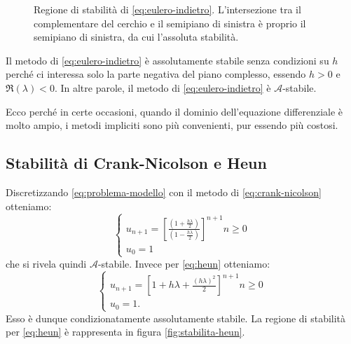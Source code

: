\begin{figure}[htpb]
	\caption{Regione di stabilità di \eqref{eq:eulero-indietro}. L'intersezione tra il complementare del cerchio e il semipiano di sinistra è proprio il semipiano di sinistra, da cui l'assoluta stabilità.}
\end{figure}
\FloatBarrier

Il metodo di \eqref{eq:eulero-indietro} è assolutamente stabile senza condizioni su $h$ perché ci interessa solo la parte negativa del piano complesso, essendo $h >0$ e $\Re ( \lambda ) < 0$.
In altre parole, il metodo di \eqref{eq:eulero-indietro} è $\mathcal{A}$-stabile.

Ecco perché in certe occasioni, quando il dominio dell'equazione differenziale è molto ampio, i metodi impliciti sono più convenienti, pur essendo più costosi.


\subsection{Stabilità di Crank-Nicolson e Heun}
Discretizzando \eqref{eq:problema-modello} con il metodo di \eqref{eq:crank-nicolson} otteniamo:
\begin{equation*}\tag{CN'} %
\begin{cases}
u_{n+1} =\left[\frac{\left( 1+\frac{h\lambda }{2}\right)}{\left( 1-\frac{h\lambda }{2}\right)}\right]^{n+1} n\geqslant 0\\
u_{0} =1
\end{cases}
\end{equation*}
che si rivela quindi $\mathcal{A}$-stabile. Invece per \eqref{eq:heun} otteniamo:
\begin{equation*}\tag{H'} %
\begin{cases}
u_{n+1} =\left[ 1+h\lambda +\frac{( h\lambda )^{2}}{2}\right]^{n+1} n\geqslant 0\\
u_{0} =1.
\end{cases}
\end{equation*}
Esso è dunque condizionatamente assolutamente stabile. La regione di stabilità per \eqref{eq:heun} è rappresenta in figura \ref{fig:stabilita-heun}.

